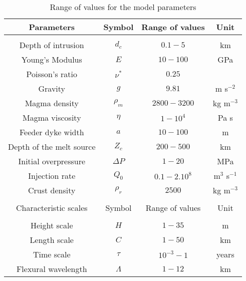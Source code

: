 \begin{table}
  \caption{Range of values for the model parameters}
  \centering
  \begin{tabular}{c|c|c|c}
    \hline
    Parameters& Symbol & Range of values &Unit\\
    \hline
              &&\\
    Depth of intrusion & $d_c$ & $0.1-5$ &km \\
    Young's Modulus & $E$ & $10-100$ &GPa \\
    Poisson's ratio & $\nu^*$ & $0.25$ &\\
    Gravity & $g$ & $9.81$ &m s$^{-2}$ \\
    Magma density & $\rho_{m}$ & $2800-3200$ &kg m$^{-3}$ \\
    Magma viscosity & $\eta $ & $1-10^{4}$ &Pa s \\
    Feeder dyke width & $a$ & $10-100$ &m \\
    Depth of the melt source & $Z_{c}$ & $ 200-500$& km \\ 
    Initial overpressure & $\Delta P$ & $1-20$ &MPa \\
    Injection rate & $Q_{0}$ &$0.1-2.10^8$ &m$^{3}$ s$^{-1}$ \\
    Crust density & $\rho_{r}$ & $2500$ &kg m$^{-3}$ \\
              &&\\
    \hline
    Characteristic scales & Symbol & Range of values & Unit\\
    \hline
              &&\\
    Height scale & $H$& $1-35$ &m \\
    Length scale & $C$    & $1-50$ &km \\
    Time scale & $\tau$ & $10^{-3}-1$ &years \\
    Flexural wavelength & $\Lambda$ & $1-12$& km 
                                      \label{tab2}
  \end{tabular} 
\end{table}
	 
